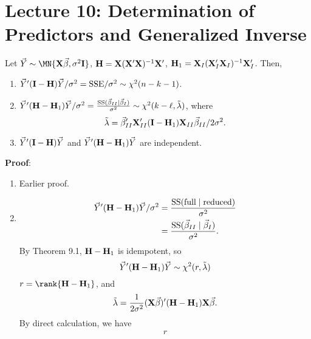 \section{Lecture 10: Determination of Predictors and Generalized Inverse}
\begin{Theorem}{}{}
    Let $ \Vector{Y}\sim \MN{\Matrix{X}\Vector{\beta},\sigma^2 \Matrix{I}} $,
    $ \mathbf{H}=\mathbf{X}(\mathbf{X}'\mathbf{X})^{-1}\mathbf{X}' $,
    $ \mathbf{H}_1=\mathbf{X}_I(\mathbf{X}_I'\mathbf{X}_I)^{-1}\mathbf{X}_I' $.
    Then,
    \begin{enumerate}[(1)]
        \item $ \vec{Y}'(\mathbf{I}-\mathbf{H})\vec{Y}/\sigma^2=
                  \text{SSE}/\sigma^2 \sim \chi^2(n-k-1) $.
        \item $ \vec{Y}'(\mathbf{H}-\mathbf{H}_1)\vec{Y}/\sigma^2=\frac{\text{SS}(\vec{\beta}_{II}\mid \vec{\beta}_I)}{\sigma^2}
                  \sim \chi^2(k-\ell,\tilde{\lambda}) $, where
              \[ \tilde{\lambda}=\vec{\beta}_{II}'\mathbf{X}_{II}'(\mathbf{I}-\mathbf{H}_1)\mathbf{X}_{II}\vec{\beta}_{II}/2\sigma^2. \]
        \item $ \vec{Y}'(\mathbf{I}-\mathbf{H})\vec{Y} $ and $ \vec{Y}'(\mathbf{H}-\mathbf{H}_1)\vec{Y} $
              are independent.
    \end{enumerate}
    \tcblower{}
    \textbf{Proof}:
    \begin{enumerate}[(1)]
        \item Earlier proof.
        \item \begin{align*}
                  \vec{Y}'(\mathbf{H}-\mathbf{H}_1)\vec{Y}/\sigma^2
                   & =\frac{\text{SS}(\text{full}\mid \text{reduced})}{\sigma^2}            \\
                   & =\frac{\text{SS}(\vec{\beta}_{II}\mid \vec{\beta}_I)}{\sigma^2}.
              \end{align*}
              By Theorem 9.1, $ \mathbf{H}-\mathbf{H}_1 $ is idempotent, so
              \[ \vec{Y}'(\mathbf{H}-\mathbf{H}_1)\vec{Y} \sim \chi^2(r,\tilde{\lambda}) \]
              $ r=\rank{\Matrix{H}-\Matrix{H}_1} $, and
              \[ \tilde{\lambda}=\frac{1}{2\sigma^2}(\mathbf{X}\vec{\beta})'(\mathbf{H}-\mathbf{H}_1)\mathbf{X}\vec{\beta}. \]
              By direct calculation, we have
              \begin{align*}
                  r

\end{align*}
\end{enumerate}
\end{Theorem}
